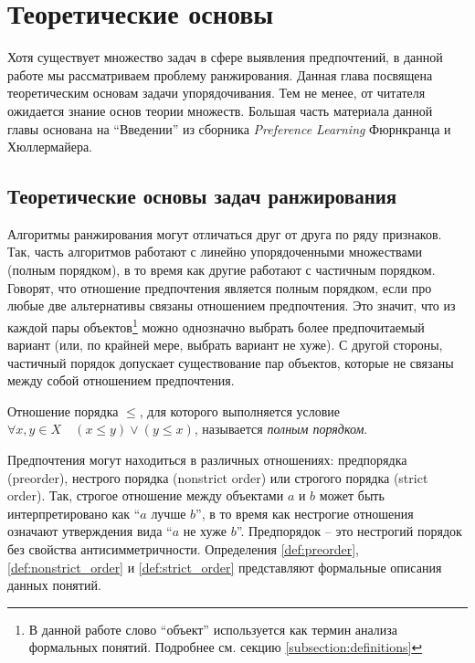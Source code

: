\chapter{Теоретические основы}
\label{chapter:theory}

Хотя существует множество задач в сфере выявления предпочтений, в данной работе мы рассматриваем проблему ранжирования. Данная глава посвящена теоретическим основам задачи упорядочивания. Тем не менее, от читателя ожидается знание основ теории множеств. Большая часть материала данной главы основана на \enquote{Введении} из сборника \textit{Preference Learning} Фюрнкранца и Хюллермайера\cite{plbook:Introduction:2010}.


\section{Теоретические основы задач ранжирования}

	Алгоритмы ранжирования могут отличаться друг от друга по ряду признаков. Так, часть алгоритмов работают с линейно упорядоченными множествами (полным порядком), в то время как другие работают с частичным порядком. Говорят, что отношение предпочтения является полным порядком, если про любые две альтернативы связаны отношением предпочтения. Это значит, что из каждой пары объектов\footnote{В данной работе слово \enquote{объект} используется как термин анализа формальных понятий. Подробнее см. секцию \ref{subsection:definitions}} можно однозначно выбрать более предпочитаемый вариант (или, по крайней мере, выбрать вариант не хуже). С другой стороны, частичный порядок допускает существование пар объектов, которые не связаны между собой отношением предпочтения. 
	\begin{definition}
	\label{def:total_order}
		Отношение порядка $\leq$, для которого выполняется условие
		$\forall x,y\in X \quad  ( x\leq y) \vee (y \leq x)$,
		называется \emph{полным порядком}.
	\end{definition}
	
	Предпочтения могут находиться в различных отношениях: предпорядка (preorder), нестрого порядка (nonstrict order) или строгого порядка (strict order). Так, строгое отношение между объектами $a$ и $b$ может быть интерпретировано как \enquote{$a$ лучше $b$}, в то время как нестрогие отношения означают утверждения вида \enquote{$a$ не хуже $b$}\cite[p.~384]{Barten:1982}. Предпорядок – это нестрогий порядок без свойства антисимметричности. Определения \ref{def:preorder}, \ref{def:nonstrict_order} и \ref{def:strict_order} представляют формальные описания данных понятий.
	
